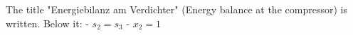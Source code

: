 The title "Energiebilanz am Verdichter" (Energy balance at the compressor) is written. Below it:  
- \( s_2 = s_3 \)  
- \( x_2 = 1 \)